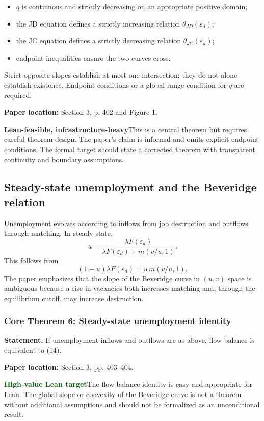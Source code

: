\documentclass[11pt]{article}
\newcommand{\leanhigh}{\textcolor{darkgreen}{\textbf{High-value Lean target}}}
\newcommand{\leaninfra}{\textcolor{darkamber}{\textbf{Lean-feasible, infrastructure-heavy}}}
\newcommand{\papersec}[1]{\textbf{Paper location:} #1}
\newcommand{\statusbox}[2]{\colorbox{#1}{\parbox{0.94\linewidth}{#2}}}
\newcommand{\epsd}{\varepsilon_d}
\begin{document}
\begin{itemize}
\item $q$ is continuous and strictly decreasing on an appropriate positive domain;
\item the JD equation defines a strictly increasing relation $\theta_{JD}(\epsd)$;
\item the JC equation defines a strictly decreasing relation $\theta_{JC}(\epsd)$;
\item endpoint inequalities ensure the two curves cross.
\end{itemize}

Strict opposite slopes establish at most one intersection; they do not alone establish existence. Endpoint conditions or a global range condition for $q$ are required.

\papersec{Section 3, p. 402 and Figure 1.}

\statusbox{softamber}{\leaninfra\quad This is a central theorem but requires careful theorem design. The paper's claim is informal and omits explicit endpoint conditions. The formal target should state a corrected theorem with transparent continuity and boundary assumptions.}

\subsection{Steady-state unemployment and the Beveridge relation}
Unemployment evolves according to inflows from job destruction and outflows through matching. In steady state,
\begin{equation}
u=\frac{\lambda F(\epsd)}{\lambda F(\epsd)+m(v/u,1)}. \tag{14}
\end{equation}
This follows from
\[
(1-u)\lambda F(\epsd)=u\,m(v/u,1).
\]
The paper emphasizes that the slope of the Beveridge curve in $(u,v)$ space is ambiguous because a rise in vacancies both increases matching and, through the equilibrium cutoff, may increase destruction.

\subsubsection*{Core Theorem 6: Steady-state unemployment identity}
\textbf{Statement.} If unemployment inflows and outflows are as above, flow balance is equivalent to (14).

\papersec{Section 3, pp. 403--404.}

\statusbox{softgreen}{\leanhigh\quad The flow-balance identity is easy and appropriate for Lean. The global slope or convexity of the Beveridge curve is not a theorem without additional assumptions and should not be formalized as an unconditional result.}
\end{document}
